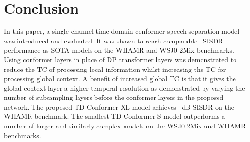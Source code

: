\section{Conclusion}\label{sec:conclusions}
In this paper, a single-channel time-domain conformer speech separation model was introduced and evaluated. It was shown to reach comparable ~SISDR performance as \ac{SOTA} models on the WHAMR and WSJ0-2Mix benchmarks.
Using conformer layers in place of \ac{DP} transformer layers was demonstrated to reduce the \ac{TC} of processing local information whilst increasing the \ac{TC} for processing global context. A benefit of increased global \ac{TC} is that it gives the global context layer a higher temporal resolution as demonstrated by varying the number of subsampling layers before the conformer layers in the proposed network. The proposed TD-Conformer-XL model achieves ~dB  \ac{SISDR} on the WHAMR benchmark. The smallest TD-Conformer-S model outperforms a number of larger and similarly complex models on the WSJ0-2Mix and WHAMR benchmarks. 

